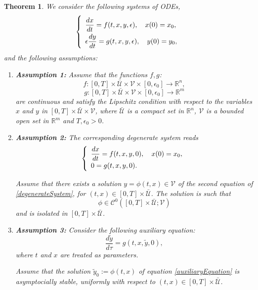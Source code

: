 \documentclass{article}
\newtheorem{theorem}{Theorem}
\theoremstyle{definition}
\theoremstyle{remark}
\begin{document}
\begin{appendix}
\begin{theorem}
We consider the following systems of ODEs,
\begin{equation}\label{orginalProbelm}
\def\arraystretch{2}
\left\lbrace \begin{array}{l}
\dfrac{d x}{dt} = f(t,x,y,\epsilon), \quad x(0) = x_0, \\
\epsilon \dfrac{d y}{dt} = g(t,x,y,\epsilon), \quad y(0) = y_0, \\
\end{array} \right.
\end{equation}and the following assumptions:
\begin{enumerate}
\item \textbf{Assumption 1:} Assume that the functions $f, g$:
$$
f : [0, T]\times \mathcal{\bar{U}} \times \mathcal{V} \times [0, \epsilon_0] \rightarrow \mathbb{R}^n,
$$
$$
g : [0, T]\times \mathcal{\bar{U}} \times \mathcal{V} \times [0, \epsilon_0] \rightarrow \mathbb{R}^m
$$
are continuous and satisfy the Lipschitz condition with respect to the variables $x$ and $y$ in $[0, T]\times \mathcal{\bar{U}} \times \mathcal{V}$, where $\mathcal{\bar{U}}$ is a compact set in $\mathbb{R}^n$, $\mathcal{V}$ is a bounded open set in $\mathbb{R}^m$ and $T, \epsilon_0 > 0$.
\item \textbf{Assumption 2:} The corresponding degenerate system reads
\begin{equation} \label{degenerateSystem}
\def\arraystretch{1.2}
\left\lbrace \begin{array}{l}
\dfrac{d x}{dt} = f(t,x,y,0), \quad x(0) = x_0, \\
0 =  g(t,x,y,0).
\end{array} \right.
\end{equation}

Assume that there exists a solution $y = \phi(t, x) \in \mathcal{V}$ of the second equation of \eqref{degenerateSystem}, for $(t,x) \in [0, T]\times \mathcal{\bar{U}}$. The solution is such that
$$
\phi \in \mathcal{C}^0([0, T]\times \mathcal{\bar{U}} ; \mathcal{V})
$$
and is isolated in $[0, T]\times \mathcal{\bar{U}}$.
\item \textbf{Assumption 3:} Consider the following auxiliary equation:
\begin{equation}\label{auxiliaryEquation}
\dfrac{d \tilde{y}}{d \tau} =  g(t,x,\tilde{y},0),
\end{equation}
where $t$ and $x$ are treated as parameters.

Assume that the solution $\tilde{y}_0 := \phi(t, x)$ of equation  \eqref{auxiliaryEquation} is asymptocially stable, uniformly with respect to $(t,x) \in [0, T]\times \mathcal{\bar{U}}$.


\end{enumerate}
\end{theorem}
\end{appendix}
\end{document}
